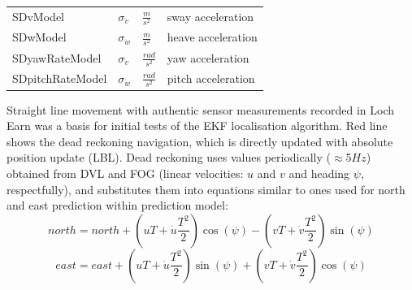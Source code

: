 \begin{table}
\begin{tabular}{llll}
\multirow{1}{*}{SDvModel} & \multirow{1}{*}{$\sigma_{\dot{v}}$}  & \multirow{1}{*}{$\frac{m}{s^{2}}$} & \multirow{1}{*}{sway acceleration} \\
\multirow{1}{*}{SDwModel} & \multirow{1}{*}{$\sigma_{\dot{w}}$}  & \multirow{1}{*}{$\frac{m}{s^{2}}$} & \multirow{1}{*}{heave acceleration} \\
\multirow{1}{*}{SDyawRateModel} & \multirow{1}{*}{$\sigma_{\dot{v}}$}  & \multirow{1}{*}{$\frac{rad}{s^{2}}$} & \multirow{1}{*}{yaw acceleration} \\
\multirow{1}{*}{SDpitchRateModel} & \multirow{1}{*}{$\sigma_{\dot{w}}$}  & \multirow{1}{*}{$\frac{rad}{s^{2}}$} & \multirow{1}{*}{pitch acceleration} \\
\bottomrule
\end{tabular} 
\end{table}
Straight line movement with authentic sensor measurements recorded in Loch Earn was a basis for initial tests of the EKF localisation algorithm. Red line shows the dead reckoning navigation, which is directly updated with absolute position update (LBL). Dead reckoning uses values periodically ($\approx$5$Hz$) obtained from DVL and FOG (linear velocities: $u$ and $v$ and heading $\psi$, respectfully), and substitutes them into equations similar to ones used for north and east prediction within prediction model: 
$$ north = north + (uT+\dot{u}\frac{T^{2}}{2})\cos(\psi) - (vT+\dot{v}\frac{T^{2}}{2})\sin(\psi) $$
$$ east  = east  + (uT+\dot{u}\frac{T^{2}}{2})\sin(\psi) + (vT+\dot{v}\frac{T^{2}}{2})\cos(\psi) $$

